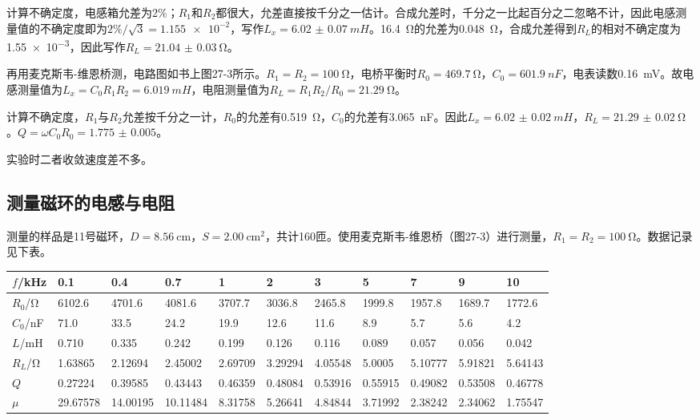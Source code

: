 \documentclass[UTF8]{ctexart}
\begin{document}
计算不确定度，电感箱允差为2\%；$R_1$和$R_2$都很大，允差直接按千分之一估计。合成允差时，千分之一比起百分之二忽略不计，因此电感测量值的不确定度即为$2\%/\sqrt{3}=\num{1.155e-2}$，写作$L_x=\SI{6.02(7)}{mH}$。\SI{16.4}{\ohm}的允差为\SI{.048}{\ohm}，合成允差得到$R_L$的相对不确定度为\num{1.55e-3}，因此写作$R_L=\SI{21.04(3)}{\ohm}$。

再用麦克斯韦-维恩桥测，电路图如书上图27-3所示。$R_1=R_2=\SI{100}{\ohm}$，电桥平衡时$R_0=\SI{469.7}{\ohm}$，$C_0=\SI{601.9}{nF}$，电表读数\SI{.16}{mV}。故电感测量值为$L_x=C_0R_1R_2=\SI{6.019}{mH}$，电阻测量值为$R_L=R_1R_2/R_0=\SI{21.29}{\ohm}$。

计算不确定度，$R_1$与$R_2$允差按千分之一计，$R_0$的允差有\SI{.519}{\ohm}，$C_0$的允差有\SI{3.065}{nF}。因此$L_x=\SI{6.02(2)}{mH}$，$R_L=\SI{21.29(2)}{\ohm}$。$Q=\omega C_0R_0=\num{1.775(5)}$。

实验时二者收敛速度差不多。

\subsection{测量磁环的电感与电阻}
测量的样品是11号磁环，$D=\SI{8.56}{\cm}$，$S=\SI{2.00}{\cm^2}$，共计160匝。使用麦克斯韦-维恩桥（图27-3）进行测量，$R_1=R_2=\SI{100}{\ohm}$。数据记录见下表。
\begin{center}
\begin{tabu}{X[c]|X[c]X[c]X[c]X[c]X[c]X[c]X[c]X[c]X[c]X[c]}
\hline
$f$/kHz	&0.1&0.4&0.7&1&2&3&5&7&9&10\\
\hline
$R_0$/\si{\ohm}&6102.6&4701.6&4081.6&3707.7&3036.8&2465.8&1999.8&1957.8&1689.7&1772.6\\
$C_0$/nF&71.0&33.5&24.2&19.9&12.6&11.6&8.9&5.7&5.6&4.2\\
\hline
$L$/mH&0.710&0.335&0.242&0.199&0.126&0.116&0.089&0.057&0.056&0.042\\
$R_L$/\si{\ohm}&1.63865 &2.12694 &2.45002 &2.69709 &3.29294 &4.05548 &5.0005 &5.10777 &5.91821 &5.64143\\
\hline
$Q$&0.27224 &0.39585 &0.43443 &0.46359 &0.48084 &0.53916 &0.55915 &0.49082 &0.53508 &0.46778\\
$\mu$&29.67578 &14.00195 &10.11484 &8.31758 &5.26641 &4.84844 &3.71992 &2.38242 &2.34062 &1.75547\\
\hline
\end{tabu}
\end{center}
\end{document}
